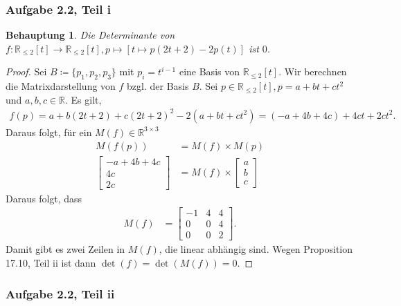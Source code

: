 \documentclass[draft,a5paper]{article}
\newtheorem*{beh}{Behauptung}
\begin{document}
\subsubsection*{Aufgabe 2.2, Teil i}

\begin{beh}
  Die Determinante von \(f \colon \mathbb{R}_{\le 2}[t] \to \mathbb{R}_{\le 2}[t], p \mapsto [t \mapsto p(2t+2)
  - 2p(t)]\) ist \(0\).
\end{beh}

\begin{proof}
  Sei \(B \coloneq \{p_{1}, p_{2}, p_{3}\}\) mit \(p_{i} = t^{i - 1}\) eine
  Basis von \(\mathbb{R}_{\le 2}[t]\).  Wir berechnen die Matrixdarstellung von
  \(f\) bzgl. der Basis \(B\).  Sei \(p \in \mathbb{R}_{\le 2}[t], p = a + bt +
  ct^{2}\) und \(a, b, c \in \mathbb{R}\). Es gilt,
  \begin{align*}
    f(p)
    = a + b(2t+2) + c(2t+2)^{2} - 2(a+bt+ct^{2})
    = (-a + 4b + 4c) + 4ct + 2ct^{2}.
  \end{align*}
  Daraus folgt, für ein \(M(f) \in \mathbb{R}^{3 \times 3}\)
  \begin{align*}
    M(f(p))
    &= M(f) \times M(p) \\
     \begin{bmatrix}
        -a + 4b + 4c \\
        4c \\
        2c
      \end{bmatrix}
    &=
     M(f) \times
      \begin{bmatrix}
        a \\
        b \\
        c
      \end{bmatrix}
  \end{align*}
  Daraus folgt, dass
  \begin{align*}
    M(f)
    &=
      \begin{bmatrix}
        -1 & 4 & 4 \\
        0 & 0 & 4 \\
        0 & 0 & 2
      \end{bmatrix}.
  \end{align*}
  Damit gibt es zwei Zeilen in \(M(f)\), die linear abhängig sind.
  Wegen Proposition 17.10, Teil ii ist dann
  \(\det(f) = \det(M(f)) = 0\).
\end{proof}

\subsubsection*{Aufgabe 2.2, Teil ii}
\end{document}
